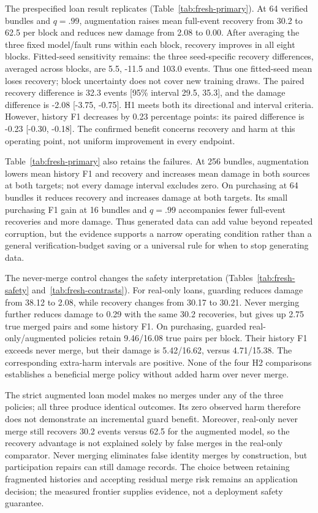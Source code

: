 The prespecified loan result replicates (Table~\ref{tab:fresh-primary}). At 64 verified bundles and $q=.99$, augmentation raises mean full-event recovery from 30.2 to 62.5 per block and reduces new damage from 2.08 to 0.00. After averaging the three fixed model/fault runs within each block, recovery improves in all eight blocks. Fitted-seed sensitivity remains: the three seed-specific recovery differences, averaged across blocks, are 5.5, -11.5 and 103.0 events. Thus one fitted-seed mean loses recovery; block uncertainty does not cover new training draws. The paired recovery difference is 32.3 events [95\% interval 29.5, 35.3], and the damage difference is -2.08 [-3.75, -0.75]. H1 meets both its directional and interval criteria. However, history F1 decreases by 0.23 percentage points: its paired difference is -0.23 [-0.30, -0.18]. The confirmed benefit concerns recovery and harm at this operating point, not uniform improvement in every endpoint.

Table~\ref{tab:fresh-primary} also retains the failures. At 256 bundles, augmentation lowers mean history F1 and recovery and increases mean damage in both sources at both targets; not every damage interval excludes zero. On purchasing at 64 bundles it reduces recovery and increases damage at both targets. Its small purchasing F1 gain at 16 bundles and $q=.99$ accompanies fewer full-event recoveries and more damage. Thus generated data can add value beyond repeated corruption, but the evidence supports a narrow operating condition rather than a general verification-budget saving or a universal rule for when to stop generating data.

The never-merge control changes the safety interpretation (Tables~\ref{tab:fresh-safety} and~\ref{tab:fresh-contrasts}). For real-only loans, guarding reduces damage from 38.12 to 2.08, while recovery changes from 30.17 to 30.21. Never merging further reduces damage to 0.29 with the same 30.2 recoveries, but gives up 2.75 true merged pairs and some history F1. On purchasing, guarded real-only/augmented policies retain 9.46/16.08 true pairs per block. Their history F1 exceeds never merge, but their damage is 5.42/16.62, versus 4.71/15.38. The corresponding extra-harm intervals are positive. None of the four H2 comparisons establishes a beneficial merge policy without added harm over never merge.

The strict augmented loan model makes no merges under any of the three policies; all three produce identical outcomes. Its zero observed harm therefore does not demonstrate an incremental guard benefit. Moreover, real-only never merge still recovers 30.2 events versus 62.5 for the augmented model, so the recovery advantage is not explained solely by false merges in the real-only comparator. Never merging eliminates false identity merges by construction, but participation repairs can still damage records. The choice between retaining fragmented histories and accepting residual merge risk remains an application decision; the measured frontier supplies evidence, not a deployment safety guarantee.

